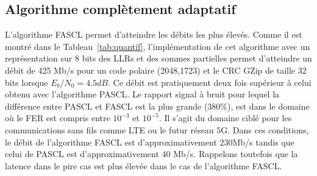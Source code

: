\subsection{Algorithme complètement adaptatif}
L'algorithme FASCL permet d'atteindre les débits les plus élevés. Comme il est montré dans le Tableau~\ref{tab:quantif}, l'implémentation de cet algorithme avec un représentation sur 8 bits des LLRs et des sommes partielles permet d'atteindre un débit de 425 Mb/s pour un code polaire (2048,1723) et le CRC GZip de taille 32 bits lorsque $E_b/N_0=4.5dB$. Ce débit est pratiquement deux fois supérieur à celui obtenu avec l'algorithme PASCL. Le rapport signal à bruit pour lequel la différence entre PASCL et FASCL est la plus grande (380\%), est dans le domaine où le FER est compris entre $10^{-3}$ et $10^{-5}$. Il s'agit du domaine ciblé pour les communications sans fils comme LTE ou le futur réseau 5G. Dans ces conditions, le débit de l'algorithme FASCL est d'approximativement 230Mb/s tandis que celui de PASCL est d'approximativement 40 Mb/s. Rappelons toutefois que la latence dans le pire cas est plus élevée dans le cas de l'algorithme FASCL.

